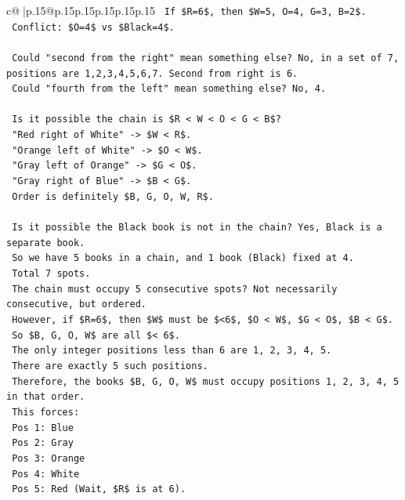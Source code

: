 \documentclass{article}
\begin{document}
{\begin{supertabular}{c@{$\;$}|p{.15\linewidth}@{}p{.15\linewidth}p{.15\linewidth}p{.15\linewidth}p{.15\linewidth}p{.15\linewidth}}
{{{\texttt{    If \$R=6\$, then \$W=5, O=4, G=3, B=2\$.} \\
\texttt{    Conflict: \$O=4\$ vs \$Black=4\$.} \\
\\ 
\texttt{    Could "second from the right" mean something else? No, in a set of 7, positions are 1,2,3,4,5,6,7. Second from right is 6.} \\
\texttt{    Could "fourth from the left" mean something else? No, 4.} \\
\\ 
\texttt{    Is it possible the chain is \$R < W < O < G < B\$?} \\
\texttt{    "Red right of White" {-}> \$W < R\$.} \\
\texttt{    "Orange left of White" {-}> \$O < W\$.} \\
\texttt{    "Gray left of Orange" {-}> \$G < O\$.} \\
\texttt{    "Gray right of Blue" {-}> \$B < G\$.} \\
\texttt{    Order is definitely \$B, G, O, W, R\$.} \\
\\ 
\texttt{    Is it possible the Black book is not in the chain? Yes, Black is a separate book.} \\
\texttt{    So we have 5 books in a chain, and 1 book (Black) fixed at 4.} \\
\texttt{    Total 7 spots.} \\
\texttt{    The chain must occupy 5 consecutive spots? Not necessarily consecutive, but ordered.} \\
\texttt{    However, if \$R=6\$, then \$W\$ must be \$<6\$, \$O < W\$, \$G < O\$, \$B < G\$.} \\
\texttt{    So \$B, G, O, W\$ are all \$< 6\$.} \\
\texttt{    The only integer positions less than 6 are 1, 2, 3, 4, 5.} \\
\texttt{    There are exactly 5 such positions.} \\
\texttt{    Therefore, the books \$B, G, O, W\$ must occupy positions 1, 2, 3, 4, 5 in that order.} \\
\texttt{    This forces:} \\
\texttt{    Pos 1: Blue} \\
\texttt{    Pos 2: Gray} \\
\texttt{    Pos 3: Orange} \\
\texttt{    Pos 4: White} \\
\texttt{    Pos 5: Red (Wait, \$R\$ is at 6).} \\
}}}
\end{supertabular}}
\end{document}
